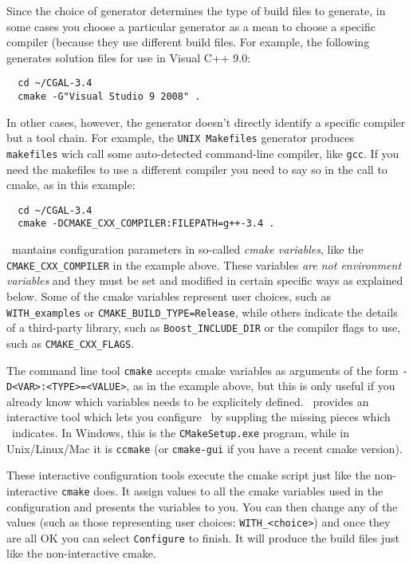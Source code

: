 Since the choice of generator determines the type of build files to generate, in some cases
you choose a particular generator as a mean to choose a specific compiler (because they use different 
build files. For example, the following generates solution files for use in Visual C++ 9.0:

{\ccTexHtml{\scriptsize}{}
\begin{verbatim}
  cd ~/CGAL-3.4
  cmake -G"Visual Studio 9 2008" . 
\end{verbatim}
}

In other cases, however, the generator doesn't directly identify a specific compiler but a tool chain.
For example, the \texttt{UNIX Makefiles} generator produces \texttt{makefiles} wich call some auto-detected
command-line compiler, like \texttt{gcc}. If you need the makefiles to use a different compiler you need to
say so in the call to cmake, as in this example:

{\ccTexHtml{\scriptsize}{}
\begin{verbatim}
  cd ~/CGAL-3.4
  cmake -DCMAKE_CXX_COMPILER:FILEPATH=g++-3.4 . 
\end{verbatim}
}


\cmake\ mantains configuration parameters in so-called {\em cmake variables}, like the \texttt{CMAKE\_CXX\_COMPILER}
in the example above. These variables {\em are not environment variables} and they must be set and modified in
certain specific ways as explained below. Some of the cmake variables represent user choices, such as
\texttt{WITH\_examples} or \texttt{CMAKE\_BUILD\_TYPE=Release}, while others indicate the details of a third-party library, 
such as \texttt{Boost\_INCLUDE\_DIR} or the compiler flags to use, such as \texttt{CMAKE\_CXX\_FLAGS}. 

The command line tool \texttt{cmake} accepts cmake variables as arguments of the form \texttt{-D<VAR>:<TYPE>=<VALUE>}, as
in the example above, but this is only useful if you already know which variables needs to be explicitely defined.
\cmake\ provides an interactive tool which lets you configure \cgal\ by suppling the missing pieces 
which \cmake\ indicates. In Windows, this is the \texttt{CMakeSetup.exe} program, while in Unix/Linux/Mac it is \texttt{ccmake}
(or \texttt{cmake-gui} if you have a recent cmake version). 

These interactive configuration tools execute the cmake script just like the non-interactive \texttt{cmake} does. It assign
values to all the cmake variables used in the configuration and presents the variables to you. You can then change 
any of the values (such as those representing user choices: \texttt{WITH\_<choice>}) and once they are all OK you can select 
\texttt{Configure} to finish. It will produce the build files just like the non-interactive cmake.

